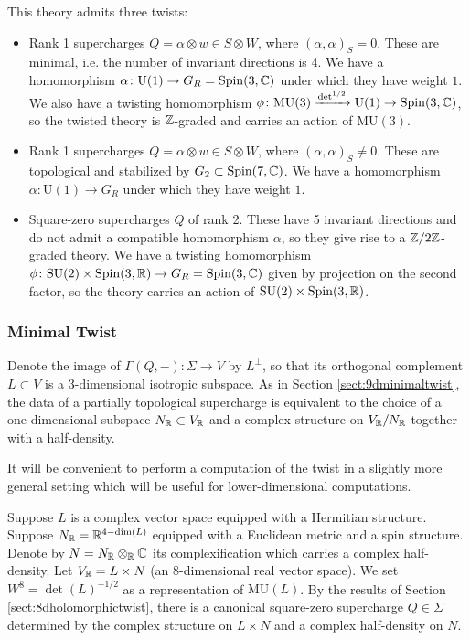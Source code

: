 \documentclass[10pt, oneside]{article}
\newcommand{\MU}{\mathrm{MU}}
\renewcommand{\U}{\mathrm{U}}
\begin{document}
This theory admits three twists:
\begin{itemize}
\item Rank 1 supercharges $Q=\alpha\otimes w\in S\otimes W$, where $(\alpha, \alpha)_S = 0$. These are minimal, i.e. the number of invariant directions is 4. We have a homomorphism $\alpha\colon \U(1)\rightarrow G_R=\Spin(3, \CC)$ under which they have weight $1$. We also have a twisting homomorphism $\phi\colon \MU(3)\xrightarrow{\det^{1/2}} \U(1)\rightarrow \Spin(3, \CC)$, so the twisted theory is $\mathbb Z$-graded and carries an action of $\MU(3)$.

\item Rank 1 supercharges $Q = \alpha \otimes w \in S \otimes W$, where $(\alpha, \alpha)_S\neq 0$. These are topological and stabilized by $G_2\subset \mathrm{Spin}(7, \mathbb C)$. We have a homomorphism $\alpha\colon \U(1)\rightarrow G_R$ under which they have weight $1$.

\item Square-zero supercharges $Q$ of rank 2. These have 5 invariant directions and do not admit a compatible homomorphism $\alpha$, so they give rise to a $\mathbb Z/2\mathbb Z$-graded theory. We have a twisting homomorphism $\phi\colon \mathrm{SU}(2)\times \mathrm{Spin}(3, \mathbb R)\rightarrow G_R=\mathrm{Spin}(3, \mathbb C)$ given by projection on the second factor, so the theory carries an action of $\mathrm{SU}(2)\times\mathrm{Spin}(3, \mathbb R)$.
\end{itemize}

\subsubsection{Minimal Twist}
\label{sect:7dminimaltwist}

Denote the image of $\Gamma(Q, -)\colon \Sigma\rightarrow V$ by $L^\perp$, so that its orthogonal complement $L\subset V$ is a 3-dimensional isotropic subspace. As in Section \ref{sect:9dminimaltwist}, the data of a partially topological supercharge is equivalent to the choice of a one-dimensional subspace $N_\mathbb R\subset V_\mathbb R$ and a complex structure on $V_\mathbb R/N_\mathbb R$ together with a half-density.

It will be convenient to perform a computation of the twist in a slightly more general setting which will be useful for lower-dimensional computations.

Suppose $L$ is a complex vector space equipped with a Hermitian structure. Suppose $N_\mathbb R=\mathbb R^{4-\dim(L)}$ equipped with a Euclidean metric and a spin structure. Denote by $N=N_\mathbb R\otimes_\mathbb R\mathbb C$ its complexification which carries a complex half-density. Let $V_\mathbb R = L\times N$ (an 8-dimensional real vector space). We set $W^8=\det(L)^{-1/2}$ as a representation of $\MU(L)$. By the results of Section \ref{sect:8dholomorphictwist}, there is a canonical square-zero supercharge $Q\in\Sigma$ determined by the complex structure on $L\times N$ and a complex half-density on $N$.
\end{document}
